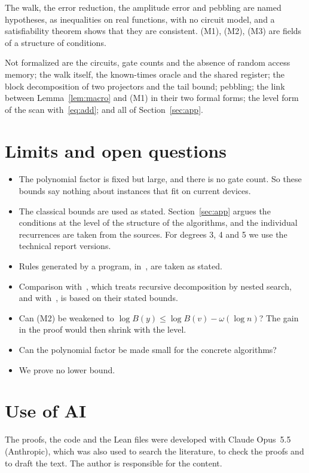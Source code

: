 \documentclass[11pt]{article}
\theoremstyle{definition}
\theoremstyle{remark}
\begin{document}
The walk, the error reduction, the amplitude error and pebbling are named hypotheses, as inequalities on real functions, with no circuit model, and a satisfiability theorem shows that they are consistent. (M1), (M2), (M3) are fields of a structure of conditions.

Not formalized are the circuits, gate counts and the absence of random access memory; the walk itself, the known-times oracle and the shared register; the block decomposition of two projectors and the tail bound; pebbling; the link between Lemma~\ref{lem:macro} and (M1) in their two formal forms; the level form of the scan with~\eqref{eq:add}; and all of Section~\ref{sec:app}.

\section{Limits and open questions}

\begin{itemize}[leftmargin=1.5em]
\item The polynomial factor is fixed but large, and there is no gate count. So these bounds say nothing about instances that fit on current devices.
\item The classical bounds are used as stated. Section~\ref{sec:app} argues the conditions at the level of the structure of the algorithms, and the individual recurrences are taken from the sources. For degrees 3, 4 and 5 we use the technical report versions.
\item Rules generated by a program, in~\cite{CGHMZ25}, are taken as stated.
\item Comparison with~\cite{Fur08}, which treats recursive decomposition by nested search, and with~\cite{Jel21}, is based on their stated bounds.
\item Can (M2) be weakened to $\log B(y)\le\log B(v)-\omega(\log n)$? The gain in the proof would then shrink with the level.
\item Can the polynomial factor be made small for the concrete algorithms?
\item We prove no lower bound.
\end{itemize}

\section*{Use of AI}

The proofs, the code and the Lean files were developed with Claude Opus~5.5 (Anthropic), which was also used to search the literature, to check the proofs and to draft the text. The author is responsible for the content.
\end{document}
